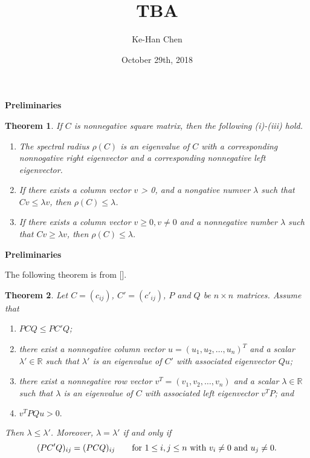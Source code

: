 \documentclass{beamer}
\theoremstyle{plain}
\newtheorem{thm}{Theorem}[section]
\theoremstyle{definition}
\begin{document}
\title[]{TBA}
\author[]{Ke-Han Chen\\} %
\date{October 29th, 2018}

\begin{frame}
\maketitle
\end{frame}

\begin{frame}{\bf Preliminaries}
    \begin{thm}
        If $C$ is nonnegative square matrix, then the following (i)-(iii) hold.
    \begin{enumerate}
        \item[(i)] The spectral radius $\rho(C)$ is an eigenvalue of $C$ with a corresponding nonnogative right eigenvector and a corresponding nonnegative left eigenvector.
        \item[(ii)] If there exists a column vector $v$ > 0, and a nongative numver $\lambda$ such that $Cv \leq \lambda v$, then $\rho(C) \leq \lambda$.
        \item[(iii)] If there exists a column vector $v \geq 0, v \neq 0$ and a nonnegative number $\lambda$ such that $Cv \geq \lambda v$, then $\rho(C) \leq \lambda$.
    \end{enumerate}

    \end{thm}
\end{frame}

\begin{frame}{\bf Preliminaries}

The following theorem is from [].

\begin{thm}
 Let $C=(c_{ij})$, $C'=(c'_{ij})$, $P$ and $Q$ be  $n\times n$ matrices.
Assume that
\begin{enumerate}
\item[(i)]    $PCQ\leq PC'Q$;
\item[(ii)]  there exist a nonnegative column vector $u=(u_1, u_2, \ldots, u_n)^T$  and a scalar $\lambda'\in \mathbb{R}$ such that $\lambda'$ is an eigenvalue of $C'$ with associated eigenvector $Qu$;
\item[(iii)] there exist a nonnegative row vector $v^T=(v_1, v_2, \ldots, v_n)$  and a scalar $\lambda\in \mathbb{R}$
such that $\lambda$ is an eigenvalue of $C$ with associated  left eigenvector $v^TP$; and
\item[(iv)] $v^TPQu>0.$
\end{enumerate}
 Then $\lambda\leq \lambda'$.
    Moreover, $\lambda=\lambda'$ 
if and only if
\begin{equation*}
(PC'Q)_{ij}=(PCQ)_{ij}\qquad \hbox{for~}1\leq i, j\leq n \hbox{~with~} v_i\ne 0 \hbox{~and~} u_j\ne 0.
\end{equation*}
\end{thm}
\end{frame}
\end{document}
